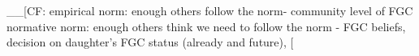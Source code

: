 \documentclass[12pt,]{article}
\begin{document}

 
\_\_{[}CF: empirical norm:  enough others follow the norm-  community level of FGC \cite{Bicc10} normative norm:  enough others think we need to follow the norm -  FGC beliefs, decision on daughter's FGC status (already and future), \cite{Bicc10}{[}






\end{document}
